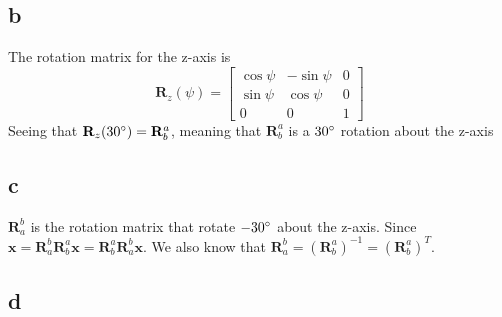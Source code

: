 \documentclass[11pt]{article}
\begin{document}
\subsection*{b}
The rotation matrix for the z-axis is
\[\mathbf{R}_z(\psi) = 
\begin{bmatrix}
\cos{\psi} & -\sin{\psi} & 0 \\
\sin{\psi} & \cos{\psi} & 0 \\
0 & 0 & 1
\end{bmatrix}
\]
Seeing that $\mathbf{R}_z(30\degree) = \mathbf{R}_b^a$, meaning that $\mathbf{R}_b^a$ is a $30\degree$ rotation about the z-axis

\subsection*{c}
$\mathbf{R}_a^b$ is the rotation matrix that rotate $-30\degree$ about the z-axis. Since $\mathbf{x} = \mathbf{R}_a^b \mathbf{R}_b^a \mathbf{x} = \mathbf{R}_b^a \mathbf{R}_a^b \mathbf{x}$. We also know that $\mathbf{R}_a^b = (\mathbf{R}_b^a)^{-1} = (\mathbf{R}_b^a)^{T}$.

\subsection*{d}
\end{document}
